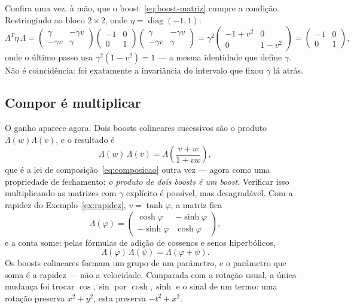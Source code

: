\documentclass[12pt,a4paper,oneside]{book}
\theoremstyle{rgplain}
\theoremstyle{rgremark}
\begin{document}
Confira uma vez, à mão, que o boost~\eqref{eq:boost-matriz} cumpre a
condição. Restringindo ao bloco $2\times2$, onde $\eta=\operatorname{diag}(-1,1)$:
\[
  \Lambda^{T}\eta\,\Lambda=
  \begin{pmatrix}\gamma & -\gamma v\\ -\gamma v & \gamma\end{pmatrix}
  \begin{pmatrix}-1 & 0\\ 0 & 1\end{pmatrix}
  \begin{pmatrix}\gamma & -\gamma v\\ -\gamma v & \gamma\end{pmatrix}
  =\gamma^2
  \begin{pmatrix}-1+v^2 & 0\\ 0 & 1-v^2\end{pmatrix}
  =\begin{pmatrix}-1 & 0\\ 0 & 1\end{pmatrix},
\]
onde o último passo usa $\gamma^2(1-v^2)=1$ --- a mesma identidade que define
$\gamma$. Não é coincidência: foi exatamente a invariância do intervalo que
fixou $\gamma$ lá atrás.

\subsection*{Compor é multiplicar}

O ganho aparece agora. Dois boosts colineares sucessivos são o produto
$\Lambda(w)\Lambda(v)$, e o resultado é
\begin{equation}
  \Lambda(w)\,\Lambda(v)=\Lambda\!\left(\frac{v+w}{1+vw}\right),
  \label{eq:composicao-matriz}
\end{equation}
que é a lei de composição~\eqref{eq:composicao} outra vez --- agora como uma
propriedade de fechamento: \emph{o produto de dois boosts é um boost}. Verificar
isso multiplicando as matrizes com $\gamma$ explícito é possível, mas
desagradável. Com a rapidez do Exemplo~\ref{ex:rapidez}, $v=\tanh\varphi$, a
matriz fica
\begin{equation}
  \Lambda(\varphi)=
  \begin{pmatrix}
    \cosh\varphi & -\sinh\varphi\\
    -\sinh\varphi & \cosh\varphi
  \end{pmatrix},
  \label{eq:boost-rapidez}
\end{equation}
e a conta some: pelas fórmulas de adição de cossenos e senos hiperbólicos,
\[
  \Lambda(\varphi)\,\Lambda(\psi)=\Lambda(\varphi+\psi).
\]
Os boosts colineares formam um grupo de um parâmetro, e o parâmetro que soma é
a rapidez --- não a velocidade. Comparada com a rotação usual, a única mudança
foi trocar $\cos,\sin$ por $\cosh,\sinh$ e o sinal de um termo: uma rotação
preserva $x^2+y^2$, esta preserva $-t^2+x^2$.
\end{document}
